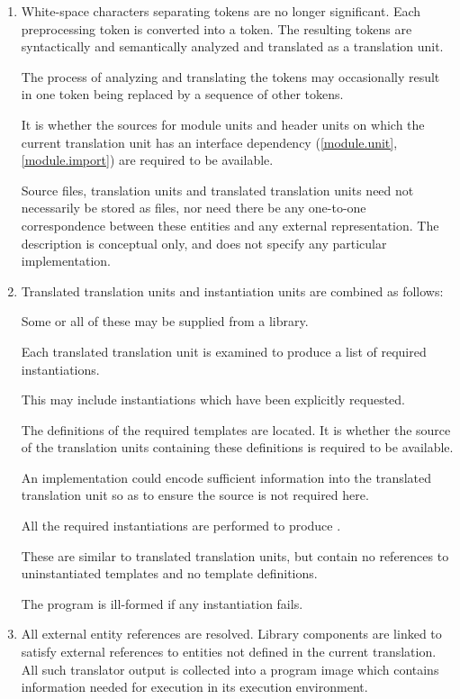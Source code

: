 \begin{enumerate}
\item White-space characters separating tokens are no longer
significant. Each preprocessing token is converted into a
token. The resulting tokens are syntactically and
semantically analyzed and translated as a translation unit.
\begin{note}
The process of analyzing and translating the tokens may occasionally
result in one token being replaced by a sequence of other
tokens.
\end{note}
It is
whether the sources for
module units and header units
on which the current translation unit has an interface
dependency (\ref{module.unit}, \ref{module.import})
are required to be available.
\begin{note}
Source files, translation
units and translated translation units need not necessarily be stored as
files, nor need there be any one-to-one correspondence between these
entities and any external representation. The description is conceptual
only, and does not specify any particular implementation.
\end{note}

\item Translated translation units and instantiation units are combined
as follows:
\begin{note}
Some or all of these may be supplied from a
library.
\end{note}
Each translated translation unit is examined to
produce a list of required instantiations.
\begin{note}
This may include
instantiations which have been explicitly
requested.
\end{note}
The definitions of the
required templates are located. It is  whether the
source of the translation units containing these definitions is required
to be available.
\begin{note}
An implementation could encode sufficient
information into the translated translation unit so as to ensure the
source is not required here.
\end{note}
All the required instantiations
are performed to produce
.
\begin{note}
These are similar
to translated translation units, but contain no references to
uninstantiated templates and no template definitions.
\end{note}
The
program is ill-formed if any instantiation fails.

\item All external entity references are resolved. Library
components are linked to satisfy external references to
entities not defined in the current translation. All such translator
output is collected into a program image which contains information
needed for execution in its execution environment.%
\end{enumerate}

